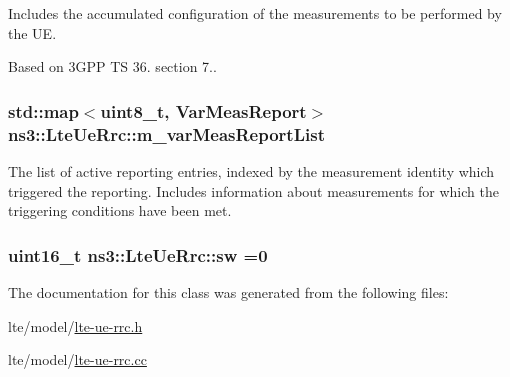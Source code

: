 Includes the accumulated configuration of the measurements to be performed by the UE. 

Based on 3\+G\+PP TS 36. section 7.. 
\subsubsection[{\texorpdfstring{m\+\_\+var\+Meas\+Report\+List}{m_varMeasReportList}}]{\setlength{\rightskip}{0pt plus 5cm}std\+::map$<$uint8\+\_\+t, {\bf Var\+Meas\+Report}$>$ ns3\+::\+Lte\+Ue\+Rrc\+::m\+\_\+var\+Meas\+Report\+List\hspace{0.3cm}{\ttfamily [private]}}\hypertarget{classns3_1_1LteUeRrc_a82da3c138c967761910c02b83724a0e4}{}\label{classns3_1_1LteUeRrc_a82da3c138c967761910c02b83724a0e4}


The list of active reporting entries, indexed by the measurement identity which triggered the reporting. Includes information about measurements for which the triggering conditions have been met. 

\subsubsection[{\texorpdfstring{sw}{sw}}]{\setlength{\rightskip}{0pt plus 5cm}uint16\+\_\+t ns3\+::\+Lte\+Ue\+Rrc\+::sw =0\hspace{0.3cm}{\ttfamily [private]}}\hypertarget{classns3_1_1LteUeRrc_a05eb539b50fe4f3240e6e79dcd1df886}{}\label{classns3_1_1LteUeRrc_a05eb539b50fe4f3240e6e79dcd1df886}


The documentation for this class was generated from the following files\+:\begin{DoxyCompactItemize}
\item 
lte/model/\hyperlink{lte-ue-rrc_8h}{lte-\/ue-\/rrc.\+h}\item 
lte/model/\hyperlink{lte-ue-rrc_8cc}{lte-\/ue-\/rrc.\+cc}\end{DoxyCompactItemize}
